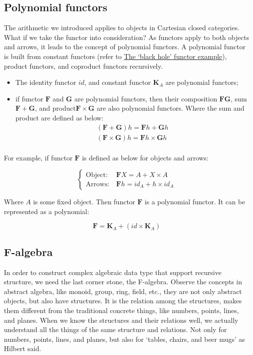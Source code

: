 \documentclass{article}
\begin{document}
\subsection{Polynomial functors}
\label{sec:polynomial-functors}

The arithmetic we introduced applies to objects in Cartesian closed categories. What if we take the functor into consideration? As functors apply to both objects and arrows, it leads to the concept of polynomial functors. A polynomial functor is built from constant functors (refer to \hyperref[sec:functor:examples]{The `black hole' functor example}), product functors, and coproduct functors recursively.

\begin{itemize}
  \item The identity functor $id$, and constant functor $\mathbf{K}_A$ are polynomial functors;
  \item if functor $\mathbf{F}$ and $\mathbf{G}$ are polynomial functors, then their composition $\mathbf{FG}$, sum $\mathbf{F} + \mathbf{G}$, and product$\mathbf{F} \times \mathbf{G}$ are also polynomial functors. Where the sum and product are defined as below:
  \[
    \begin{array}{l}
    (\mathbf{F} + \mathbf{G}) h = \mathbf{F} h + \mathbf{G} h \\
    (\mathbf{F} \times \mathbf{G}) h = \mathbf{F} h \times \mathbf{G} h \\
    \end{array}
  \]
\end{itemize}

For example, if functor $\mathbf{F}$ is defined as below for objects and arrows:

\[
\begin{cases}
\text{Object:}\ & \mathbf{F} X = A + X \times A \\
\text{Arrows:}\ & \mathbf{F} h = id_A + h \times id_A
\end{cases}
\]

Where $A$ is some fixed object. Then functor $\mathbf{F}$ is a polynomial functor. It can be represented as a polynomial:

\[
\mathbf{F} = \mathbf{K}_A + (id \times \mathbf{K}_A)
\]

\subsection{F-algebra}

In order to construct complex algebraic data type that support recursive structure, we need the last corner stone, the F-algebra. Observe the concepts in abstract algebra, like monoid, group, ring, field, etc., they are not only abstract objects, but also have structures. It is the relation among the structures, makes them different from the traditional concrete things, like numbers, points, lines, and planes. When we know the structures and their relations well, we actually understand all the things of the same structure and relations. Not only for numbers, points, lines, and planes, but also for `tables, chairs, and beer mugs' as Hilbert said.
\end{document}
